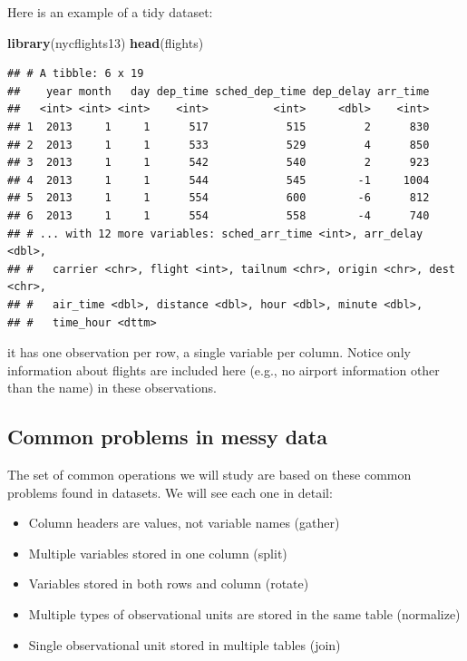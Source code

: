 \documentclass[]{article}
\newenvironment{Shaded}{\begin{snugshade}}{\end{snugshade}}
\newcommand{\KeywordTok}[1]{\textcolor[rgb]{0.13,0.29,0.53}{\textbf{{#1}}}}
\newcommand{\NormalTok}[1]{{#1}}
\theoremstyle{definition}
\theoremstyle{definition}
\theoremstyle{remark}
\begin{document}
Here is an example of a tidy dataset:

\begin{Shaded}
\begin{Highlighting}[]
\KeywordTok{library}\NormalTok{(nycflights13)}
\KeywordTok{head}\NormalTok{(flights)}
\end{Highlighting}
\end{Shaded}

\begin{verbatim}
## # A tibble: 6 x 19
##    year month   day dep_time sched_dep_time dep_delay arr_time
##   <int> <int> <int>    <int>          <int>     <dbl>    <int>
## 1  2013     1     1      517            515         2      830
## 2  2013     1     1      533            529         4      850
## 3  2013     1     1      542            540         2      923
## 4  2013     1     1      544            545        -1     1004
## 5  2013     1     1      554            600        -6      812
## 6  2013     1     1      554            558        -4      740
## # ... with 12 more variables: sched_arr_time <int>, arr_delay <dbl>,
## #   carrier <chr>, flight <int>, tailnum <chr>, origin <chr>, dest <chr>,
## #   air_time <dbl>, distance <dbl>, hour <dbl>, minute <dbl>,
## #   time_hour <dttm>
\end{verbatim}

it has one observation per row, a single variable per column. Notice
only information about flights are included here (e.g., no airport
information other than the name) in these observations.

\subsection{Common problems in messy
data}\label{common-problems-in-messy-data}

The set of common operations we will study are based on these common
problems found in datasets. We will see each one in detail:

\begin{itemize}
\itemsep1pt\parskip0pt
\item
  Column headers are values, not variable names (gather)\\
\item
  Multiple variables stored in one column (split)\\
\item
  Variables stored in both rows and column (rotate)\\
\item
  Multiple types of observational units are stored in the same table
  (normalize)\\
\item
  Single observational unit stored in multiple tables (join)
\end{itemize}
\end{document}
